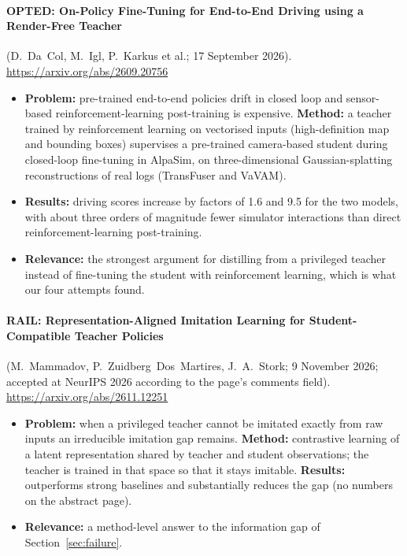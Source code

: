 \paragraph{OPTED: On-Policy Fine-Tuning for End-to-End Driving using a Render-Free Teacher} (D.~Da~Col, M.~Igl, P.~Karkus et al.; 17 September 2026). \url{https://arxiv.org/abs/2609.20756}
\begin{itemize}
\item \textbf{Problem:} pre-trained end-to-end policies drift in closed loop and sensor-based reinforcement-learning post-training is expensive. \textbf{Method:} a teacher trained by reinforcement learning on vectorised inputs (high-definition map and bounding boxes) supervises a pre-trained camera-based student during closed-loop fine-tuning in AlpaSim, on three-dimensional Gaussian-splatting reconstructions of real logs (TransFuser and VaVAM).
\item \textbf{Results:} driving scores increase by factors of 1.6 and 9.5 for the two models, with about three orders of magnitude fewer simulator interactions than direct reinforcement-learning post-training.
\item \textbf{Relevance:} the strongest argument for distilling from a privileged teacher instead of fine-tuning the student with reinforcement learning, which is what our four attempts found.
\end{itemize}

\paragraph{RAIL: Representation-Aligned Imitation Learning for Student-Compatible Teacher Policies} (M.~Mammadov, P.~Zuidberg~Dos~Martires, J.~A.~Stork; 9 November 2026; accepted at NeurIPS 2026 according to the page's comments field). \url{https://arxiv.org/abs/2611.12251}
\begin{itemize}
\item \textbf{Problem:} when a privileged teacher cannot be imitated exactly from raw inputs an irreducible imitation gap remains. \textbf{Method:} contrastive learning of a latent representation shared by teacher and student observations; the teacher is trained in that space so that it stays imitable. \textbf{Results:} outperforms strong baselines and substantially reduces the gap (no numbers on the abstract page).
\item \textbf{Relevance:} a method-level answer to the information gap of Section~\ref{sec:failure}.
\end{itemize}
